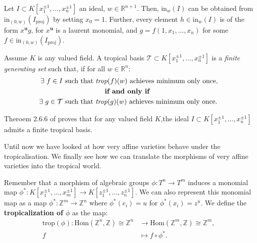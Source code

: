 \begin{proposition}
    Let $I \subset  K[x_{1}^{\pm1}, \dots, x_{n}^{\pm1}]$ an ideal, $w \in \mathbb{R}^{n+1}$.
    Then, $\text{in}_{w}(I)$ can be obtained from $\text{in}_{(0,w)}(I_{\text{proj}})$ by setting $x_{0} = 1$.
    Further, every element $h \in \text{in}_{w}(I)$ is of the form $x^{\textbf{u}}g$, for $x^{\textbf{u}}$ is a laurent monomial, and $g = f(1, x_{1},\dots, x_{n})$ for some $f \in \text{in}_{(0,w)}(I_{\text{proj}})$.
\end{proposition}

\begin{definition}
   Assume $K$ is any valued field.
   A tropical basis $\mathcal{T}\subset K[x_1^{\pm 1}, \dots, x_n^{\pm 1}]$ is a \textit{finite generating set} such that, if for all $w \in \mathbb{R}^{n}$:
    \begin{align*}
        \exists ~f \in I~\text{such that }&\emph{trop}(f)(w)~\text{achieves minimum only once},\\
                                                          &~~~~\textbf{if and only if}\\
        \exists ~g \in \mathcal{T}~\text{such that }&\emph{trop}(g)(w)~\text{achieves minimum only once}.
    \end{align*}
\end{definition}

\begin{remark}
    Theroem 2.6.6 of \cite{maclagan2015introduction} proves that for any valued field $K$,the ideal $I \subset  K[x_{1}^{\pm1}, \dots, x_{n}^{\pm1}]$ admits a finite tropical basis.
\end{remark}

Until now we have looked at how very affine varieties behave under the tropicalisation.
We finally see how we can translate the morphisms of very affine varieties into the tropical world.
    \par Remember that a morphism of algebraic groups $\phi : T^{n}\to T^{m}$ induces a monomial map $\phi^{*}:K[x_1^{\pm 1}, \dots, x_m^{\pm 1}]\to K[z_1^{\pm 1}, \dots, z_n^{\pm 1}]$. 
    We can also represent this monomial map as a map $\phi^{*}: \mathbb{Z}^{m}\to \mathbb{Z}^{n}$ where $\phi^{*}(e_i) = u$ for $\phi^{*}(x_i) = z^u$. 
    We define the \textbf{tropicalization of $\phi$} as the map:
    \begin{align*}
        \text{trop}(\phi): \text{Hom}(\mathbb{Z}^{n},\mathbb{Z})\cong \mathbb{Z}^{n} &\to \text{Hom}(\mathbb{Z}^{m},\mathbb{Z})\cong \mathbb{Z}^{m},\\
        f &\mapsto f \circ \phi^{*}.
    \end{align*}


